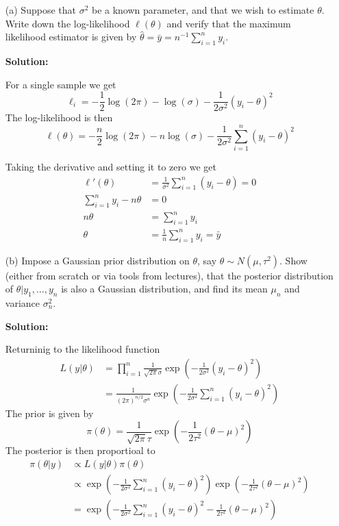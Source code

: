 \documentclass{article}
\begin{document}
\begin{enumerate}
    \item[(a)] Suppose that $\sigma^2$ be a known parameter, and that we wish to estimate $\theta$. Write down the log-likelihood $\ell(\theta)$ and verify that the maximum likelihood estimator is given by $\hat{\theta} = \bar{y} = n^{-1} \sum_{i=1}^n y_i$.

    \textbf{Solution:}
    \par

    For a single sample we get
    \[
    \ell_i = -\frac{1}{2} \log(2\pi) - \log(\sigma) - \frac{1}{2\sigma^2} (y_i - \theta)^2
    \]
    The log-likelihood is then
    \[
    \ell(\theta) = -\frac{n}{2} \log(2\pi) - n \log(\sigma) - \frac{1}{2\sigma^2} \sum_{i=1}^n (y_i - \theta)^2
    \]

    Taking the derivative and setting it to zero we get
    \begin{align*}
        \ell'(\theta) &= \frac{1}{\sigma^2} \sum_{i=1}^n (y_i - \theta) = 0\\
        \sum_{i=1}^n y_i - n\theta &= 0\\
        n\theta &= \sum_{i=1}^n y_i\\
        \theta &= \frac{1}{n} \sum_{i=1}^n y_i = \bar{y}
    \end{align*}


    \item[(b)] Impose a Gaussian prior distribution on $\theta$, say $\theta \sim N(\mu, \tau^2)$. Show (either from scratch or via tools from lectures), that the posterior distribution of $\theta | y_1, \dots, y_n$ is also a Gaussian distribution, and find its mean $\mu_n$ and variance $\sigma_n^2$.
    
    \textbf{Solution:}
    \par
    Returninig to the likelihood function
    \begin{align*}
        L(y|\theta) &= \prod_{i=1}^n \frac{1}{\sqrt{2\pi} \sigma} \exp\left(-\frac{1}{2\sigma^2} (y_i - \theta)^2\right)\\
        &= \frac{1}{(2\pi)^{n/2} \sigma^n} \exp\left(-\frac{1}{2\sigma^2} \sum_{i=1}^n (y_i - \theta)^2\right)
    \end{align*}
    The prior is given by
    \[
    \pi(\theta) = \frac{1}{\sqrt{2\pi} \tau} \exp\left(-\frac{1}{2\tau^2} (\theta - \mu)^2\right)
    \]
    The posterior is then proportioal to
    \begin{align*}
        \pi(\theta | y) &\propto L(y|\theta) \pi(\theta)\\
        &\propto \exp\left(-\frac{1}{2\sigma^2} \sum_{i=1}^n (y_i - \theta)^2\right) \exp\left(-\frac{1}{2\tau^2} (\theta - \mu)^2\right)\\
        &= \exp\left(-\frac{1}{2\sigma^2} \sum_{i=1}^n (y_i - \theta)^2 -\frac{1}{2\tau^2} (\theta - \mu)^2\right)\\
    \end{align*}


\end{enumerate}
\end{document}
